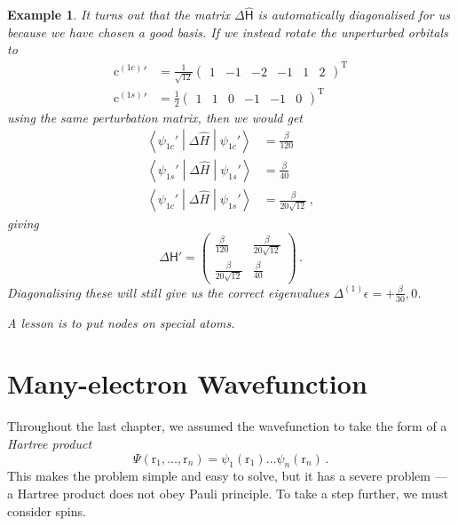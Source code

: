\documentclass{article}
\theoremstyle{plain}\theoremheaderfont{\normalfont\itshape}\theorembodyfont{\rmfamily}\theoremseparator{.}\newtheorem*{rem}{Remark}\newtheorem*{ex}{Example}\newtheorem*{proof}{Proof}\newtheorem*{altp}{Alternative proof}
\theoremstyle{plain}\theoremheaderfont{\normalfont\bfseries}\theorembodyfont{\rmfamily}\theoremseparator{.}\newtheorem{thm}{Theorem}[section]\newtheorem{lem}[thm]{Lemma}\newtheorem{prop}[thm]{Proposition}\newtheorem*{cor}{Corollary}\newtheorem{defn}[thm]{Definition}\newtheorem{clm}[thm]{Claim}\newtheorem{clminproof}{Claim}\newtheorem{pos}{Postulate}[section]
\theoremstyle{break}\theoremheaderfont{\normalfont\itshape}\theorembodyfont{\rmfamily}\theoremseparator{.\medskip}\newtheorem*{proofskip}{Proof}\newtheorem*{exs}{Examples}\newtheorem*{rems}{Remarks}
\theoremstyle{break}\theoremheaderfont{\normalfont\bfseries}\theorembodyfont{\rmfamily}\theoremseparator{.\medskip}\newtheorem{lemskip}[thm]{Lemma}\newtheorem{defnskip}[thm]{Definition}\newtheorem{propskip}[thm]{Proposition}\newtheorem{thmskip}[thm]{Theorem}
\numberwithin{equation}{section}
\newcommand{\tp}{^\mathrm{T}}
\newcommand{\expval}[2]{\left\langle #2 \middle| #1 \middle| #2 \right\rangle}
\newcommand{\mel}[3]{\left\langle #1 \middle| #2 \middle| #3 \right\rangle}
\newcommand{\vb}[1]{\bm{\mathrm{#1}}}
\begin{document}
\begin{ex}
        It turns out that the matrix \(\mathsf{\Delta \hat{H}}\) is automatically diagonalised for us because we have chosen a good basis. If we instead rotate the unperturbed orbitals to
        \begin{align}
            {\vb{c}^{(1c)}}'&=\frac{1}{\sqrt{12}}\begin{pmatrix}
                1 & -1 & -2 & -1 & 1 & 2
            \end{pmatrix}\tp\\
            {\vb{c}^{(1s)}}'&=\frac{1}{2}\begin{pmatrix}
                1 & 1 & 0 & -1 & -1 & 0
            \end{pmatrix}\tp
        \end{align}
        using the same perturbation matrix, then we would get
        \begin{align}
            \expval{\Delta\hat{H}}{\psi_{1c}'}&=\frac{\beta}{120}\\
            \expval{\Delta\hat{H}}{\psi_{1s}'}&=\frac{\beta}{40}\\
            \mel{\psi_{1c}'}{\Delta\hat{H}}{\psi_{1s}'}&=\frac{\beta}{20\sqrt{12}}\,,
        \end{align}
        giving
        \begin{equation}
            \mathsf{\Delta H}'=\begin{pmatrix}
                \frac{\beta}{120} & \frac{\beta}{20\sqrt{12}} \\
                \frac{\beta}{20\sqrt{12}} & \frac{\beta}{40}
            \end{pmatrix}\,.
        \end{equation}
        Diagonalising these will still give us the correct eigenvalues \(\Delta^{(1)}\epsilon=+\frac{\beta}{30},0\).

        A lesson is to put nodes on special atoms.
    \end{ex}

    \section{Many-electron Wavefunction}
    Throughout the last chapter, we assumed the wavefunction to take the form of a \textit{Hartree product}
    \begin{equation}\label{orbital_assumption}
        \Psi(\vb{r}_1,\dots,\vb{r}_n)=\psi_1(\vb{r}_1)\dots\psi_n(\vb{r}_n)\,.
    \end{equation}
    This makes the problem simple and easy to solve, but it has a severe problem --- a Hartree product does not obey Pauli principle. To take a step further, we must consider spins.
\end{document}
